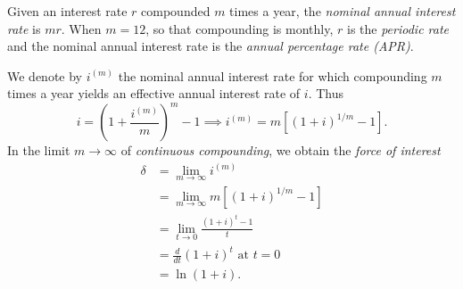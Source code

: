 \begin{defn}
Given an interest rate $r$ compounded $m$ times a year, the \emph{nominal annual interest rate} is $mr$. When $m = 12$, so that compounding is monthly, $r$ is the \emph{periodic rate} and the nominal annual interest rate is the \emph{annual percentage rate (APR)}.
\end{defn}

We denote by $i^{(m)}$ the nominal annual interest rate for which compounding $m$ times a year yields an effective annual interest rate of $i$. Thus
\begin{equation}
i = \left(1 + \frac{i^{(m)}}{m}\right)^m - 1\implies i^{(m)} = m[(1 + i)^{1/m} - 1].
\end{equation}
In the limit $m\to\infty$ of \emph{continuous compounding}, we obtain the \emph{force of interest}
\begin{equation}
\begin{split}
\delta &= \lim_{m\to\infty} i^{(m)} \\
&= \lim_{m\to\infty} m[(1 + i)^{1/m} - 1] \\
&= \lim_{t\to 0}\frac{(1 + i)^t - 1}{t} \\
&= \frac{d}{dt}(1 + i)^t\text{ at }t = 0 \\
&= \ln(1 + i).
\end{split}
\end{equation}